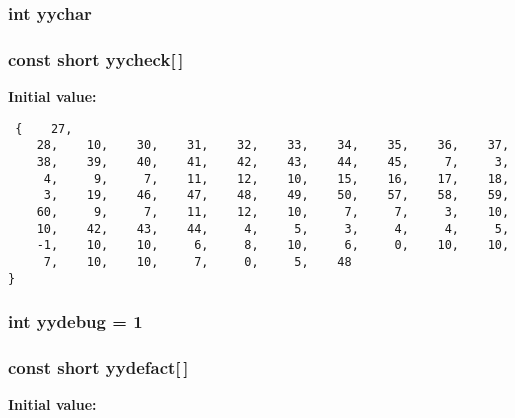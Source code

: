 \subsubsection{\setlength{\rightskip}{0pt plus 5cm}int yychar}\label{vcd__parser_8c_a97}


\subsubsection{\setlength{\rightskip}{0pt plus 5cm}const short yycheck[$\,$]\hspace{0.3cm}{\tt  [static]}}\label{vcd__parser_8c_a96}


{\bf Initial value:}

\footnotesize\begin{verbatim} {    27,
    28,    10,    30,    31,    32,    33,    34,    35,    36,    37,
    38,    39,    40,    41,    42,    43,    44,    45,     7,     3,
     4,     9,     7,    11,    12,    10,    15,    16,    17,    18,
     3,    19,    46,    47,    48,    49,    50,    57,    58,    59,
    60,     9,     7,    11,    12,    10,     7,     7,     3,    10,
    10,    42,    43,    44,     4,     5,     3,     4,     4,     5,
    -1,    10,    10,     6,     8,    10,     6,     0,    10,    10,
     7,    10,    10,     7,     0,     5,    48
}\end{verbatim}\normalsize 
{}
\subsubsection{\setlength{\rightskip}{0pt plus 5cm}int yydebug = 1}\label{vcd__parser_8c_a83}


\subsubsection{\setlength{\rightskip}{0pt plus 5cm}const short yydefact[$\,$]\hspace{0.3cm}{\tt  [static]}}\label{vcd__parser_8c_a91}


{\bf Initial value:}

